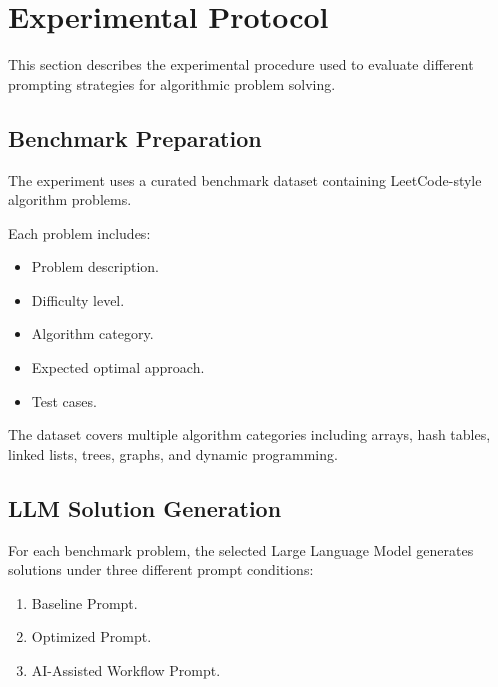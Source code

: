 \section{Experimental Protocol}


This section describes the experimental procedure used to evaluate different
prompting strategies for algorithmic problem solving.



\subsection{Benchmark Preparation}


The experiment uses a curated benchmark dataset containing LeetCode-style
algorithm problems.


Each problem includes:

\begin{itemize}

\item Problem description.

\item Difficulty level.

\item Algorithm category.

\item Expected optimal approach.

\item Test cases.

\end{itemize}



The dataset covers multiple algorithm categories including arrays, hash tables,
linked lists, trees, graphs, and dynamic programming.



\subsection{LLM Solution Generation}


For each benchmark problem, the selected Large Language Model generates
solutions under three different prompt conditions:


\begin{enumerate}

\item Baseline Prompt.

\item Optimized Prompt.

\item AI-Assisted Workflow Prompt.

\end{enumerate}


